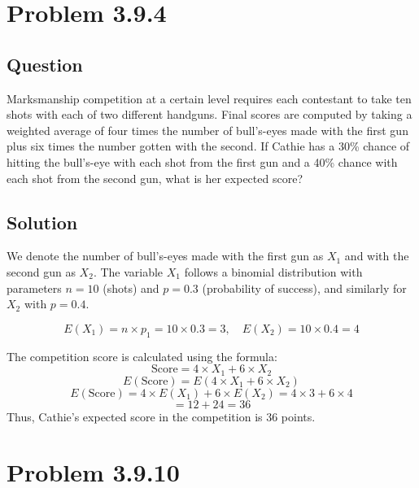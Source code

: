 \documentclass[12pt]{article}
\begin{document}
\section*{Problem 3.9.4}
\subsection*{Question}
Marksmanship competition at a certain level requires each contestant to take ten shots with each of two different handguns. Final scores are computed by taking a weighted average of four times the number of bull's-eyes made with the first gun plus six times the number gotten with the second. If Cathie has a 30\% chance of hitting the bull's-eye with each shot from the first gun and a 40\% chance with each shot from the second gun, what is her expected score?

\subsection*{Solution}
We denote the number of bull's-eyes made with the first gun as \(X_1\) and with the second gun as \(X_2\). The variable \(X_1\) follows a binomial distribution with parameters \(n = 10\) (shots) and \(p = 0.3\) (probability of success), and similarly for \(X_2\) with \(p = 0.4\).

\[
  E(X_1) = n \times p_1 = 10 \times 0.3 = 3, \quad E(X_2) = 10 \times 0.4 = 4
\]

The competition score is calculated using the formula:
\[
  \text{Score} = 4 \times X_1 + 6 \times X_2
\]
\[
  E(\text{Score}) = E(4 \times X_1 + 6 \times X_2)
\]
\[
  E(\text{Score}) = 4 \times E(X_1) + 6 \times E(X_2) = 4 \times 3 + 6 \times 4
\]
\[
  = 12 + 24 = 36
\]
Thus, Cathie's expected score in the competition is 36 points.

\pagebreak

\section*{Problem 3.9.10}
\end{document}
